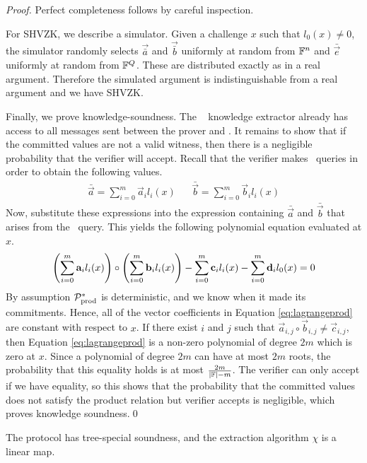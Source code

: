 \begin{proof} Perfect completeness follows by careful inspection.

For SHVZK, we describe a simulator. Given a challenge $x$ such that $l_0(x) \neq 0$, the simulator randomly selects $\vec{\bar{a}}$ and $\vec{\bar{b}}$ uniformly at random from $\mathbb{F}^n$ and $\bar{\vec{e}}$ uniformly at random from $\mathbb{F}^Q$. These are distributed exactly as in a real argument. Therefore the simulated argument is indistinguishable from a real argument and we have SHVZK.

Finally, we prove knowledge-soundness. The \ILC~ knowledge extractor already has access to all messages sent between the prover and \ILC. It remains to show that if the committed values are not a valid witness, then there is a negligible probability that the verifier will accept.
Recall that the verifier makes \ILCopen \ queries in order to obtain the following values.
\begin{align*}
\bar{\vec{a}} = \sum_{i=0}^m \vec{a}_{i} l_i(x) &&
\bar{\vec{b}} = \sum_{i=0}^m \vec{b}_{i} l_i(x)
\end{align*}
Now, substitute these expressions into the expression containing $\bar{\vec{a}}$ and $\bar{\vec{b}}$ that arises from the \ILCcheck\ query. This yields the following polynomial equation evaluated at $x$.
\begin{align}\label{eq:lagrangeprod}
\left( \sum_{i=0}^m \mathbf{a}_i l_i(x) \right) \circ \left( \sum_{i=0}^m \mathbf{b}_i l_i(x) \right) - \sum_{i=0}^m \mathbf{c}_{i} l_i(x) - \sum_{i=0}^m \mathbf{d}_i l_0(x) = 0
\end{align}
By assumption $\mathcal{P}^*_{\textnormal{prod}}$ is deterministic, and we know when it made its commitments. Hence, all of the vector coefficients in Equation \ref{eq:lagrangeprod} are constant with respect to $x$. If there exist $i$ and $j$ such that $\vec{a}_{i,j}\circ \vec{b}_{i,j}\neq \vec{c}_{i,j}$, then Equation \ref{eq:lagrangeprod} is a non-zero polynomial of degree $2m$ which is zero at $x$. Since a polynomial of degree $2m$ can have at most $2m$ roots, the probability that this equality holds is at most $\frac{2m}{|\mathbb{F}| - m}$. The verifier can only accept if we have equality, so this shows that the probability that the committed values does not satisfy the product relation but verifier accepts is negligible, which proves knowledge soundness.\qed
\end{proof}

\begin{lemma}
The protocol has tree-special soundness, and the extraction algorithm $\chi$ is a linear map.
\end{lemma}

